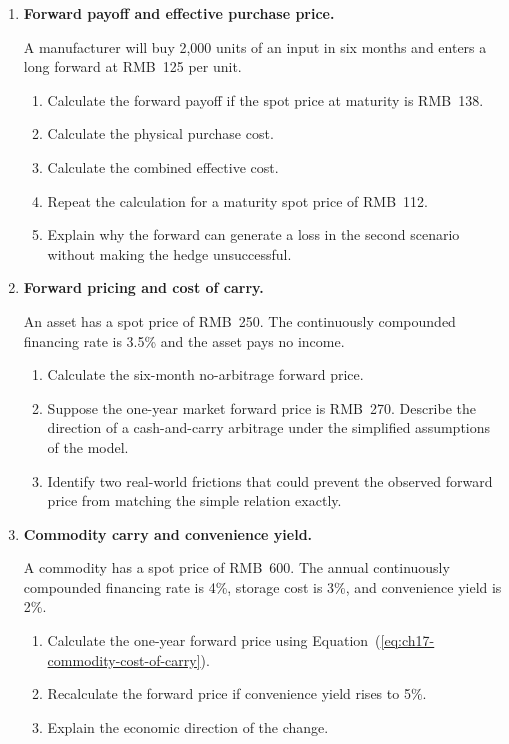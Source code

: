 

\begin{enumerate}

\item \textbf{Forward payoff and effective purchase price.}

A manufacturer will buy 2,000 units of an input in six months and enters a long forward at RMB~125 per unit.

\begin{enumerate}
\item Calculate the forward payoff if the spot price at maturity is RMB~138.
\item Calculate the physical purchase cost.
\item Calculate the combined effective cost.
\item Repeat the calculation for a maturity spot price of RMB~112.
\item Explain why the forward can generate a loss in the second scenario without making the hedge unsuccessful.
\end{enumerate}

\item \textbf{Forward pricing and cost of carry.}

An asset has a spot price of RMB~250. The continuously compounded financing rate is 3.5\% and the asset pays no income.

\begin{enumerate}
\item Calculate the six-month no-arbitrage forward price.
\item Suppose the one-year market forward price is RMB~270. Describe the direction of a cash-and-carry arbitrage under the simplified assumptions of the model.
\item Identify two real-world frictions that could prevent the observed forward price from matching the simple relation exactly.
\end{enumerate}

\item \textbf{Commodity carry and convenience yield.}

A commodity has a spot price of RMB~600. The annual continuously compounded financing rate is 4\%, storage cost is 3\%, and convenience yield is 2\%.

\begin{enumerate}
\item Calculate the one-year forward price using Equation~(\ref{eq:ch17-commodity-cost-of-carry}).
\item Recalculate the forward price if convenience yield rises to 5\%.
\item Explain the economic direction of the change.
\end{enumerate}


\end{enumerate}
